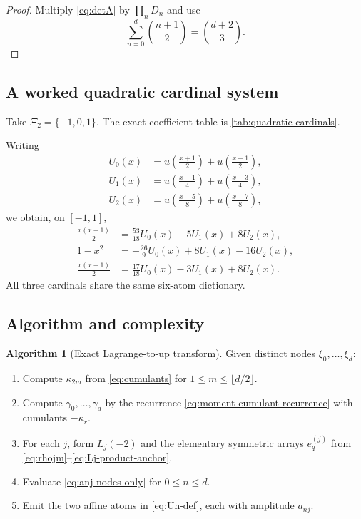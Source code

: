 \documentclass[11pt,oneside]{article}
\theoremstyle{definition}
\newtheorem{algorithm}[theorem]{Algorithm}
\theoremstyle{remark}
\begin{document}
\begin{proof}
Multiply \eqref{eq:detA} by $\prod_nD_n$ and use
\[
 \sum_{n=0}^{d}\binom{n+1}{2}=\binom{d+2}{3}.
\]
\end{proof}

\subsection{A worked quadratic cardinal system}
Take $\Xi_2=\{-1,0,1\}$.  The exact coefficient table is
\cref{tab:quadratic-cardinals}.

\begin{table}[htbp]
\centering
\small
\caption{Quadratic Lagrange cardinals in the Appell basis and in raw
up-pair amplitudes.}
\label{tab:quadratic-cardinals}
\resizebox{\textwidth}{!}{}
\end{table}

Writing
\begin{align*}
 U_0(x)&=u\!\left(\frac{x+1}{2}\right)+u\!\left(\frac{x-1}{2}\right),\\
 U_1(x)&=u\!\left(\frac{x-1}{4}\right)+u\!\left(\frac{x-3}{4}\right),\\
 U_2(x)&=u\!\left(\frac{x-5}{8}\right)+u\!\left(\frac{x-7}{8}\right),
\end{align*}
we obtain, on $[-1,1]$,
\begin{align}
 \frac{x(x-1)}2&=\frac{53}{18}U_0(x)-5U_1(x)+8U_2(x),
 \label{eq:L0-example}\\
 1-x^2&=-\frac{26}{9}U_0(x)+8U_1(x)-16U_2(x),
 \label{eq:L1-example}\\
 \frac{x(x+1)}2&=\frac{17}{18}U_0(x)-3U_1(x)+8U_2(x).
 \label{eq:L2-example}
\end{align}
All three cardinals share the same six-atom dictionary.

\subsection{Algorithm and complexity}

\begin{algorithm}[Exact Lagrange-to-up transform]
\label{alg:lagrange-up}
Given distinct nodes $\xi_0,\ldots,\xi_d$:
\begin{enumerate}
\item Compute $\kappa_{2m}$ from \eqref{eq:cumulants} for
$1\le m\le\lfloor d/2\rfloor$.
\item Compute $\gamma_0,\ldots,\gamma_d$ by the recurrence
\eqref{eq:moment-cumulant-recurrence} with cumulants $-\kappa_r$.
\item For each $j$, form $L_j(-2)$ and the elementary symmetric arrays
$e_q^{(j)}$ from \eqref{eq:rhojm}--\eqref{eq:Lj-product-anchor}.
\item Evaluate \eqref{eq:anj-nodes-only} for $0\le n\le d$.
\item Emit the two affine atoms in \eqref{eq:Un-def}, each with amplitude
$a_{nj}$.
\end{enumerate}
\end{algorithm}
\end{document}
